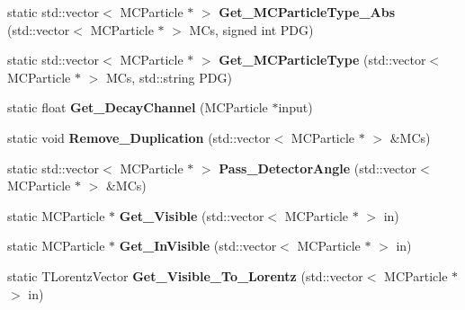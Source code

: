 \begin{DoxyCompactItemize}
\item 
\hypertarget{classToolSet_1_1CMC_a8a83c548d4fa19b657194f055f5084db}{
static std::vector$<$ MCParticle $\ast$ $>$ {\bfseries Get\_\-MCParticleType\_\-Abs} (std::vector$<$ MCParticle $\ast$ $>$ MCs, signed int PDG)}
\label{classToolSet_1_1CMC_a8a83c548d4fa19b657194f055f5084db}

\item 
\hypertarget{classToolSet_1_1CMC_a186078318b357a23930ab6b61c8d9494}{
static std::vector$<$ MCParticle $\ast$ $>$ {\bfseries Get\_\-MCParticleType} (std::vector$<$ MCParticle $\ast$ $>$ MCs, std::string PDG)}
\label{classToolSet_1_1CMC_a186078318b357a23930ab6b61c8d9494}

\item 
\hypertarget{classToolSet_1_1CMC_aa16a7d3c1cbd3e1d25cf885b25d561ec}{
static float {\bfseries Get\_\-DecayChannel} (MCParticle $\ast$input)}
\label{classToolSet_1_1CMC_aa16a7d3c1cbd3e1d25cf885b25d561ec}

\item 
\hypertarget{classToolSet_1_1CMC_acd7611ff7cc945f5d198c0c0ba0b50c2}{
static void {\bfseries Remove\_\-Duplication} (std::vector$<$ MCParticle $\ast$ $>$ \&MCs)}
\label{classToolSet_1_1CMC_acd7611ff7cc945f5d198c0c0ba0b50c2}

\item 
\hypertarget{classToolSet_1_1CMC_ac483834b1710a1c4797f3b55f8f2336b}{
static std::vector$<$ MCParticle $\ast$ $>$ {\bfseries Pass\_\-DetectorAngle} (std::vector$<$ MCParticle $\ast$ $>$ \&MCs)}
\label{classToolSet_1_1CMC_ac483834b1710a1c4797f3b55f8f2336b}

\item 
\hypertarget{classToolSet_1_1CMC_a37d3453a48a49082beb6f65827fc94b4}{
static MCParticle $\ast$ {\bfseries Get\_\-Visible} (std::vector$<$ MCParticle $\ast$ $>$ in)}
\label{classToolSet_1_1CMC_a37d3453a48a49082beb6f65827fc94b4}

\item 
\hypertarget{classToolSet_1_1CMC_a89441427db18fc75e777966d5ac169b7}{
static MCParticle $\ast$ {\bfseries Get\_\-InVisible} (std::vector$<$ MCParticle $\ast$ $>$ in)}
\label{classToolSet_1_1CMC_a89441427db18fc75e777966d5ac169b7}

\item 
\hypertarget{classToolSet_1_1CMC_a0754f20765709b34841b3c3aec8c7e51}{
static TLorentzVector {\bfseries Get\_\-Visible\_\-To\_\-Lorentz} (std::vector$<$ MCParticle $\ast$ $>$ in)}
\label{classToolSet_1_1CMC_a0754f20765709b34841b3c3aec8c7e51}


\end{DoxyCompactItemize}
